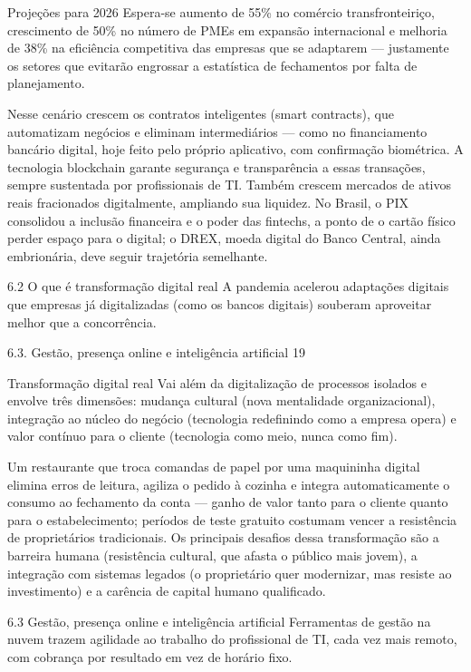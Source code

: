 Projeções para 2026 Espera-se aumento de 55\% no comércio transfronteiriço, crescimento de 50\% no número de PMEs em expansão internacional e melhoria de 38\% na eficiência competitiva das empresas que se adaptarem — justamente os setores que evitarão engrossar a estatística de fechamentos por falta de planejamento.

Nesse cenário crescem os contratos inteligentes (smart contracts), que automatizam negócios e eliminam intermediários — como no financiamento bancário digital, hoje feito pelo próprio aplicativo, com confirmação biométrica. A tecnologia blockchain garante segurança e transparência a essas transações, sempre sustentada por profissionais de TI. Também crescem mercados de ativos reais fracionados digitalmente, ampliando sua liquidez. No Brasil, o PIX consolidou a inclusão financeira e o poder das fintechs, a ponto de o cartão físico perder espaço para o digital; o DREX, moeda digital do Banco Central, ainda embrionária, deve seguir trajetória semelhante.

6.2 O que é transformação digital real A pandemia acelerou adaptações digitais que empresas já digitalizadas (como os bancos digitais) souberam aproveitar melhor que a concorrência.

6.3. Gestão, presença online e inteligência artificial 19

Transformação digital real Vai além da digitalização de processos isolados e envolve três dimensões: mudança cultural (nova mentalidade organizacional), integração ao núcleo do negócio (tecnologia redefinindo como a empresa opera) e valor contínuo para o cliente (tecnologia como meio, nunca como fim).

Um restaurante que troca comandas de papel por uma maquininha digital elimina erros de leitura, agiliza o pedido à cozinha e integra automaticamente o consumo ao fechamento da conta — ganho de valor tanto para o cliente quanto para o estabelecimento; períodos de teste gratuito costumam vencer a resistência de proprietários tradicionais. Os principais desafios dessa transformação são a barreira humana (resistência cultural, que afasta o público mais jovem), a integração com sistemas legados (o proprietário quer modernizar, mas resiste ao investimento) e a carência de capital humano qualificado.

6.3 Gestão, presença online e inteligência artificial Ferramentas de gestão na nuvem trazem agilidade ao trabalho do profissional de TI, cada vez mais remoto, com cobrança por resultado em vez de horário fixo.

